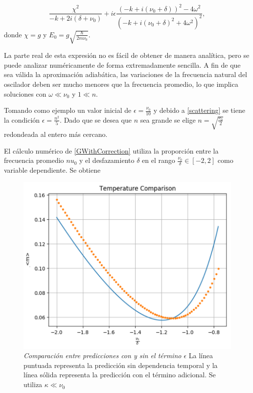 \documentclass[10pt,a4paper]{report}
\begin{document}
\begin{equation}\label{GWithCorrection}
 \frac{\chi^2}{-k + 2i(\delta + \nu_0)} +i\epsilon\frac{(-k + i(\nu_0 + \delta))^2 - 4\omega^2}{(-k + i(\nu_0 + \delta)^2 + 4\omega^2)^2},
\end{equation} donde $\chi = g$ y $ E_0 = g \sqrt{\frac{\hbar}{2m\nu_0}}$.

La parte real de esta expresión no es fácil de obtener de manera
analítica, pero se puede analizar numéricamente de forma
extremadamente sencilla. A fin de que sea válida la aproximación
adiabática, las variaciones de la frecuencia natural del oscilador
deben ser mucho menores que la frecuencia promedio, lo que
implica soluciones con $\omega \ll \nu_0$ y $1 \ll n$.

Tomando como ejemplo un valor inicial de $\epsilon = \frac{\nu_0}{10}$ y debido a \ref{scattering} se tiene la condición
$\epsilon = \frac{n^2}{5}$. Dado que se desea que $n$ sea grande se
elige $n=\sqrt{\frac{\nu_0}{2}}$ redondeada al entero más cercano.


El cálculo numérico de \eqref{GWithCorrection} utiliza la proporción entre la frecuencia promedio $nu_0$ y
el desfazamiento $\delta$ en el rango
$\frac{\nu_0}{\delta} \in [-2,2]$ como variable dependiente. Se obtiene

\begin{figure}[h!]
\includegraphics[scale=.80]{GraficaTemp.pdf} 
\caption{\textit{Comparación entre predicciones con y sin el término $\epsilon$} La línea puntuada representa la predicción sin dependencia temporal y la línea sólida representa la predicción con el término adicional.  Se utiliza $\kappa \ll \nu_0$}
\label{GraficaEnfriamiento}
\end{figure}
\end{document}
